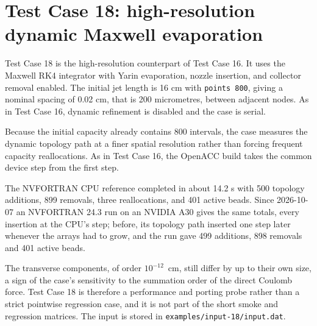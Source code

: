 \section{Test Case 18: high-resolution dynamic Maxwell evaporation}

Test Case 18 is the high-resolution counterpart of Test Case 16.  It uses the
Maxwell RK4 integrator with Yarin evaporation, nozzle insertion, and collector
removal enabled.  The initial jet length is 16 cm with \texttt{points 800},
giving a nominal spacing of 0.02 cm, that is 200 micrometres, between adjacent
nodes.  As in Test Case 16, dynamic refinement is disabled and the case is
serial.

Because the initial capacity already contains 800 intervals, the case measures
the dynamic topology path at a finer spatial resolution rather than forcing
frequent capacity reallocations.  As in Test Case 16, the OpenACC build
takes the common device step from the first step.

The NVFORTRAN CPU reference completed in about 14.2 s with 500 topology
additions, 899 removals, three reallocations, and 401 active beads.  Since
2026-10-07 an NVFORTRAN 24.3 run on an NVIDIA A30 gives the same totals,
every insertion at the CPU's step; before, its topology path inserted one
step later whenever the arrays had to grow, and the run gave 499 additions,
898 removals and 401 active beads.

The transverse components, of order $10^{-12}$~cm, still differ by up to
their own size, a sign of the case's sensitivity to the summation order of
the direct Coulomb force.  Test Case 18 is therefore a
performance and porting probe rather than a strict pointwise regression case,
and it is not part of the short smoke and regression matrices.  The input is
stored in \texttt{examples/input-18/input.dat}.

